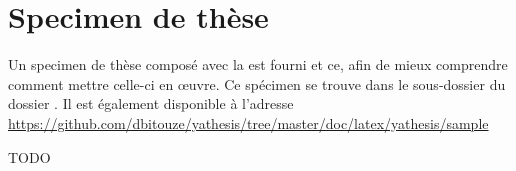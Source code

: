 \chapter{Specimen de thèse}\label{cha:specimen}

Un specimen de thèse composé avec la \yatcl est fourni et ce, afin de mieux
comprendre comment mettre celle-ci en œuvre. Ce spécimen se trouve dans le
sous-dossier  du dossier . Il
est également disponible à l'adresse
\url{https://github.com/dbitouze/yathesis/tree/master/doc/latex/yathesis/sample}

TODO

%
\iffalse
\fi
